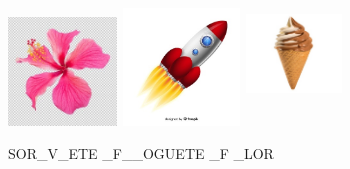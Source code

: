 \includegraphics[width=1.13542in,height=1.13542in]{media/image13.jpeg}
\includegraphics[width=1.24653in,height=1.22917in]{media/image14.jpeg}
\includegraphics[width=1.00000in,height=1.49583in]{media/image15.jpeg}

SOR\_V\_ETE \_F\_\_OGUETE \_F \_LOR


